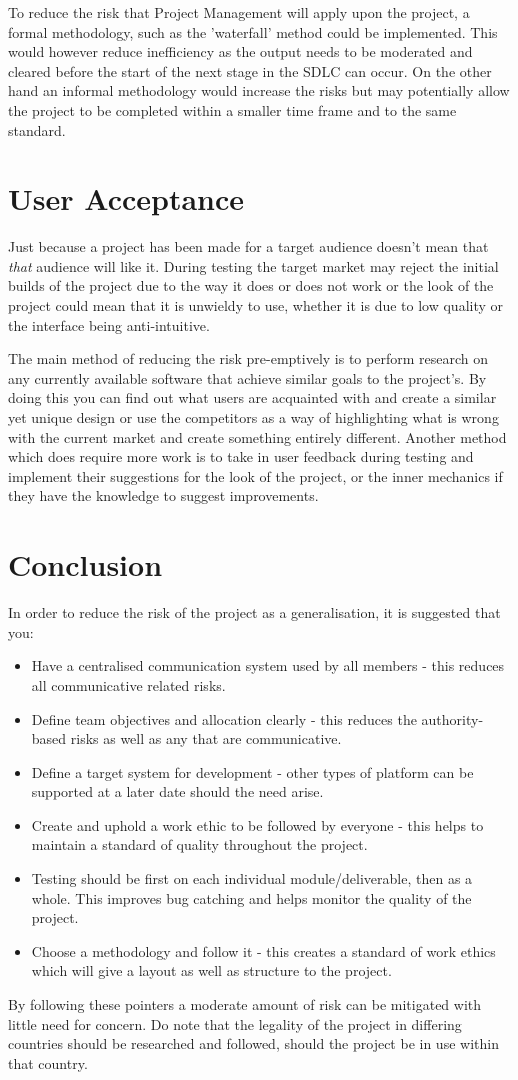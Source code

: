 To reduce the risk that Project Management will apply upon the project, a formal
methodology, such as the 'waterfall' method could be implemented.  This would
however reduce inefficiency as the output needs to be moderated and cleared
before the start of the next stage in the SDLC can occur.  On the other hand an
informal methodology would increase the risks but may potentially allow the
project to be completed within a smaller time frame and to the same standard.

\section{User Acceptance}
Just because a project has been made for a target audience doesn't mean that
\textit{that} audience will like it.  During testing the target market may
reject the initial builds of the project due to the way it does or does not work
or the look of the project could mean that it is unwieldy to use, whether it is
due to low quality or the interface being anti-intuitive.

The main method of reducing the risk pre-emptively is to perform research on any
currently available software that achieve similar goals to the project's.  By
doing this you can find out what users are acquainted with and create a similar
yet unique design or use the competitors as a way of highlighting what is wrong
with the current market and create something entirely different.  Another method
which does require more work is to take in user feedback during testing and
implement their suggestions for the look of the project, or the inner mechanics
if they have the knowledge to suggest improvements.

\section{Conclusion}
In order to reduce the risk of the project as a generalisation, it is suggested
that you:

\begin{itemize}
    \item Have a centralised communication system used by all members - this
          reduces all communicative related risks.
    \item Define team objectives and allocation clearly - this reduces the
          authority-based risks as well as any that are communicative.
    \item Define a target system for development - other types of platform can
          be supported at a later date should the need arise.
    \item Create and uphold a work ethic to be followed by everyone - this helps
          to maintain a standard of quality throughout the project.
    \item Testing should be first on each individual module/deliverable, then as
          a whole.  This improves bug catching and helps monitor the quality of
          the project.
    \item Choose a methodology and follow it - this creates a standard of work
          ethics which will give a layout as well as structure to the project.
\end{itemize}

By following these pointers a moderate amount of risk can be mitigated with
little need for concern.  Do note that the legality of the project in differing
countries should be researched and followed, should the project be in use within
that country.
